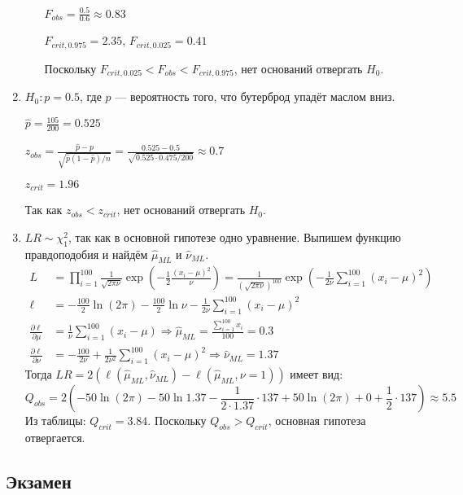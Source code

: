 \begin{enumerate}
\begin{enumerate}
$F_{obs} = \frac{0.5}{0.6} \approx 0.83$

$F_{crit, 0.975} = 2.35$, $F_{crit, 0.025} = 0.41$

Поскольку $F_{crit, 0.025} < F_{obs} < F_{crit, 0.975}$, нет оснований отвергать $H_0$.
\end{enumerate}
\item $H_0: p = 0.5$, где $p$ — вероятность того, что бутерброд упадёт маслом вниз.

$\hat{p} = \frac{105}{200} = 0.525$

$z_{obs} = \frac{\hat p - p}{\sqrt{\hat p (1 - \hat p)/n}} = \frac{0.525-0.5}{\sqrt{0.525\cdot0.475/200}} \approx 0.7$

$z_{crit} = 1.96$

Так как $z_{obs} < z_{crit}$, нет оснований отвергать $H_0$.
\item $LR \sim \chi^2_1$, так как в основной гипотезе одно уравнение.
Выпишем функцию правдоподобия и найдём $\hat{\mu}_{ML}$ и $\hat{\nu}_{ML}$.
\begin{align*}
L &= \prod_{i=1}^{100} \frac{1}{\sqrt{2\pi\nu}} \exp\left(-\frac{1}{2} \frac{(x_i-\mu)^2}{\nu} \right) = \frac{1}{(\sqrt{2\pi\nu})^{100}} \exp \left(-\frac{1}{2\nu}\sum_{i=1}^{100} (x_i - \mu)^2 \right) \\
\ell &= -\frac{100}{2}\ln (2\pi) - \frac{100}{2} \ln \nu - \frac{1}{2\nu}\sum_{i=1}^{100} (x_i - \mu)^2 \\
\frac{\partial \ell}{\partial \mu} &= \frac{1}{\nu} \sum_{i=1}^{100} (x_i - \mu) \Rightarrow \hat{\mu}_{ML} = \frac{\sum_{i=1}^{100} x_i}{100} = 0.3 \\
\frac{\partial \ell}{\partial \nu} &= -\frac{100}{2\nu} + \frac{1}{2\nu^2}\sum_{i=1}^{100} (x_i - \mu)^2 \Rightarrow \hat{\nu}_{ML} = 1.37
\end{align*}
Тогда $LR=2(\ell(\hat{\mu}_{ML}, \hat{\nu}_{ML}) - \ell(\hat{\mu}_{ML}, \nu = 1))$ имеет вид:
\[
Q_{obs}= 2 \left(-50 \ln(2\pi) - 50 \ln 1.37 - \frac{1}{2\cdot1.37}\cdot 137 + 50 \ln(2\pi) + 0 + \frac{1}{2} \cdot 137 \right) \approx 5.5
\]
Из таблицы: $Q_{crit} = 3.84$. Поскольку $Q_{obs} > Q_{crit}$, основная гипотеза отвергается.
\end{enumerate}



\subsection{Экзамен}



